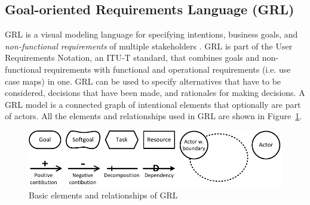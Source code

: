 \subsection{Goal-oriented Requirements Language (GRL)}
\label{sect:background:grl}
GRL is a visual modeling language for specifying intentions, business goals, and \emph{non-functional requirements} of multiple stakeholders \cite{Amyot:2010:EGM:1841349.1841356}. GRL is part of the User Requirements Notation, an ITU-T standard, that combines goals and non-functional requirements with functional and operational requirements (i.e. use case maps) in one. GRL can be used to specify alternatives that have to be considered, decisions that have been made, and rationales for making decisions. A GRL model is a connected graph of intentional elements that optionally are part of actors. All the elements and relationships used in GRL are shown in Figure~\ref{fig:grl_legend}.

\begin{figure}[ht]
\centering
\includegraphics[scale=0.6]{img/grl_legend}
\caption{Basic elements and relationships of GRL}
\label{fig:grl_legend}
\end{figure}

